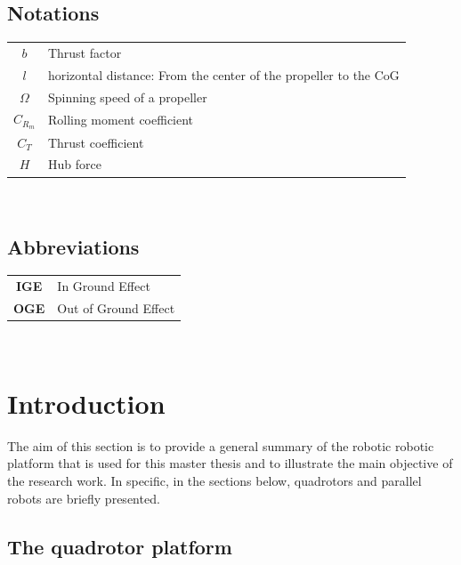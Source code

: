 \documentclass{thesisreport}
\begin{document}
 
 \newpage
 
 
 \section*{Notations}
 \begin{tabular}{cp{}}
  $b$ & Thrust factor \\
  $l$ & horizontal distance: From the center of the propeller to the CoG \\
  $\Omega$ & Spinning speed of a propeller\\
  $C_{R_m}$ & Rolling moment coefficient \\
  $C_T$ & Thrust coefficient \\
  $H$ & Hub force\\

\end{tabular}\\
 
 
 
 \newpage
 
  \section*{Abbreviations}
 \begin{tabular}{cp{}}
  \textbf{IGE} & In Ground Effect \\
  \textbf{OGE} & Out of Ground Effect \\

\end{tabular}\\
 \newpage
 
 \listoffigures
 
\listoftables
 
 \tableofcontents
 
 
 \chapter*{Introduction}
 	The aim of this section is to provide a general summary of the robotic robotic platform that is used for this master thesis and to illustrate the main objective of the research work.
In specific, in the sections below, quadrotors and parallel robots are briefly presented.


 
 
 \section*{The quadrotor platform}
\end{document}
